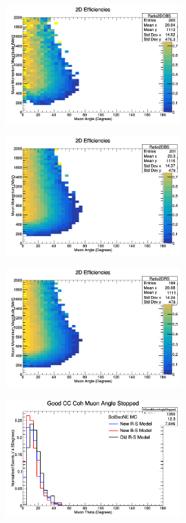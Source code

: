 \documentclass[11pt]{article}
\begin{document}
\begin{figure}[H]
\centering
\includegraphics[width=0.6\textwidth]{NMCombinedPlotsImages/7-NMCombinedPlots.png}
\caption{}
\end{figure}

\begin{figure}[H]
\centering
\includegraphics[width=0.6\textwidth]{NMCombinedPlotsImages/8-NMCombinedPlots.png}
\caption{}
\end{figure}

\begin{figure}[H]
\centering
\includegraphics[width=0.6\textwidth]{NMCombinedPlotsImages/9-NMCombinedPlots.png}
\caption{}
\end{figure}

\begin{figure}[H]
\centering
\includegraphics[width=0.6\textwidth]{NMCombinedPlotsImages/10-NMCombinedPlots.png}
\caption{}
\end{figure}
\end{document}
